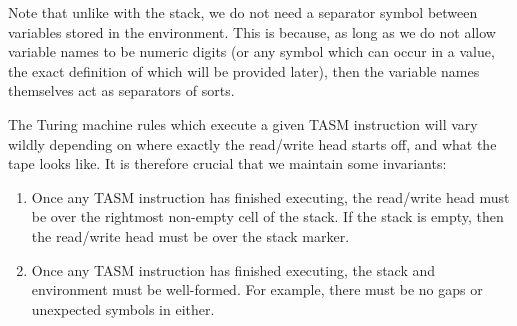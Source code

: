 \begin{center}
\end{center}

Note that unlike with the stack, we do not need a separator symbol between variables stored in the environment. This is because, as long as we do not allow variable names to be numeric digits (or any symbol which can occur in a value, the exact definition of which will be provided later), then the variable names themselves act as separators of sorts.

The Turing machine rules which execute a given TASM instruction will vary wildly depending on where exactly the read/write head starts off, and what the tape looks like. It is therefore crucial that we maintain some invariants:

\begin{enumerate}
    \item Once any TASM instruction has finished executing, the read/write head must be over the rightmost non-empty cell of the stack. If the stack is empty, then the read/write head must be over the stack marker.
    \item Once any TASM instruction has finished executing, the stack and environment must be well-formed. For example, there must be no gaps or unexpected symbols in either.
\end{enumerate}

